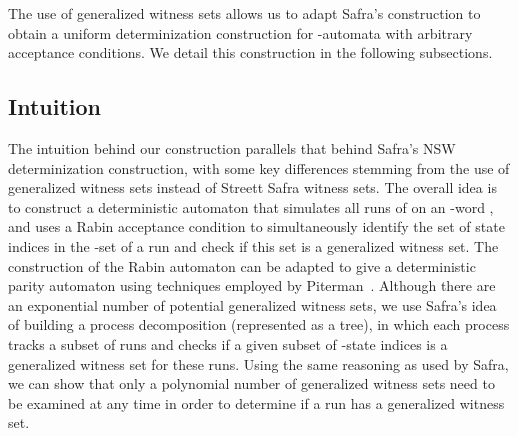 \documentclass[3p]{elsarticle}
\begin{document}
The use of generalized witness sets allows us to adapt Safra's
construction to obtain a uniform determinization construction for
-automata with arbitrary acceptance conditions.  We detail
this construction in the following subsections.

\subsection{Intuition}
\label{sec:intuition}
The intuition behind our construction parallels that behind Safra's
NSW determinization construction, with some key differences stemming
from the use of generalized witness sets instead of Streett Safra
witness sets.  The overall idea is to construct a deterministic
automaton that simulates all runs of  on an -word
, and uses a Rabin acceptance condition to simultaneously
identify the set of state indices in the -set of a run and
check if this set is a generalized witness set. The construction of
the Rabin automaton can be adapted to give a deterministic parity
automaton using techniques employed by Piterman~\cite{piterman}.
Although there are an exponential number of potential generalized
witness sets, we use Safra's idea of building a process decomposition
(represented as a tree), in which each process tracks a subset of runs
and checks if a given subset of -state indices is a generalized
witness set for these runs.  Using the same reasoning as used by
Safra, we can show that only a polynomial number of generalized
witness sets need to be examined at any time in order to determine if
a run has a generalized witness set.
\end{document}
